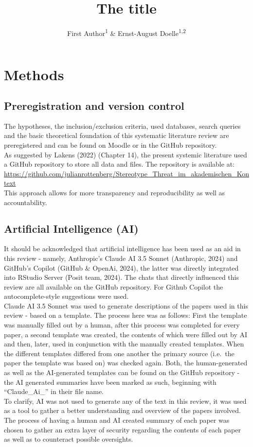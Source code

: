 \documentclass[
  stu]{apa7}
\title{The title}
\author{First Author\textsuperscript{1} \& Ernst-August Doelle\textsuperscript{1,2}}
\date{}
\affiliation{\vspace{0.5cm}\textsuperscript{1} Wilhelm-Wundt-University\\\textsuperscript{2} Konstanz Business School}
\begin{document}
\maketitle

\section{Methods}\label{methods}

\subsection{Preregistration and version control}\label{preregistration-and-version-control}

The hypotheses, the inclusion/exclusion criteria, used databases, search queries and the basic theoretical foundation of this systematic literature review are preregistered and can be found on Moodle or in the GitHub repository.\\
As suggested by Lakens (2022) (Chapter 14), the present systemic literature used a GitHub repository to store all data and files. The repository is available at: \url{https://github.com/julianrottenberg/Stereotype_Threat_im_akademischen_Kontext}\\
This approach allows for more transparency and reproducibility as well as accountability.

\subsection{Artificial Intelligence (AI)}\label{artificial-intelligence-ai}

It should be acknowledged that artificial intelligence has been used as an aid in this review - namely, Anthropic's Claude AI 3.5 Sonnet (Anthropic, 2024) and GitHub's Copilot (GitHub \& OpenAi, 2024), the latter was directly integrated into RStudio Server (Posit team, 2024). The chats that directly influenced this review are all available on the GitHub repository.
For Github Copilot the autocomplete-style suggestions were used.\\
Claude AI 3.5 Sonnet was used to generate descriptions of the papers used in this review - based on a template.
The process here was as follows: First the template was manually filled out by a human, after this process was completed for every paper, a second template was created, the contents of which were filled out by AI and then, later, used in conjunction with the manually created templates. When the different templates differed from one another the primary source (i.e.~the paper the template was based on) was checked again. Both, the human-generated as well as the AI-generated templates can be found on the GitHub repository - the AI generated summaries have been marked as such, beginning with ``Claude\_Ai\_'' in their file name.\\
To clarify, AI was not used to generate any of the text in this review, it was used as a tool to gather a better understanding and overview of the papers involved. The process of having a human and AI created summary of each paper was chosen to gather an extra layer of security regarding the contents of each paper as well as to counteract possible oversights.
\end{document}
